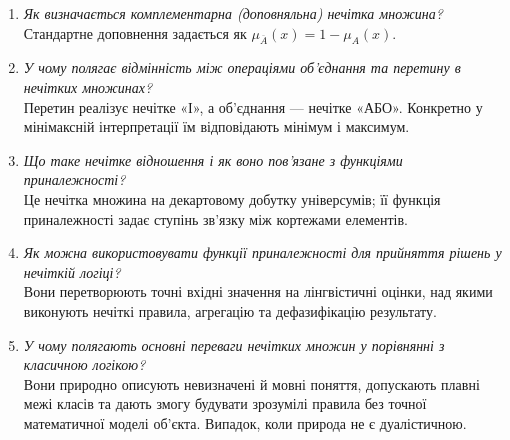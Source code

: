 \documentclass[12pt,a4paper]{article}
\begin{document}
\begin{enumerate}[leftmargin=*,itemsep=0.35em]
    Це чітка множина всіх \(x\), для яких \(\mu(x)\geq\alpha\).
  \item \textit{Як визначається комплементарна (доповняльна) нечітка множина?}\\
    Стандартне доповнення задається як
    \(\mu_{\overline A}(x)=1-\mu_A(x)\).
  \item \textit{У чому полягає відмінність між операціями об'єднання та перетину в
    нечітких множинах?}\\
    Перетин реалізує нечітке «І», а об'єднання --- нечітке «АБО». Конкретно у
    мінімаксній інтерпретації їм відповідають мінімум і максимум.
  \item \textit{Що таке нечітке відношення і як воно пов'язане з функціями
    приналежності?}\\
    Це нечітка множина на декартовому добутку універсумів; її функція
    приналежності задає ступінь зв'язку між кортежами елементів.
  \item \textit{Як можна використовувати функції приналежності для прийняття рішень у
    нечіткій логіці?}\\
    Вони перетворюють точні вхідні значення на лінгвістичні оцінки, над
    якими виконують нечіткі правила, агрегацію та дефазифікацію результату.
  \item \textit{У чому полягають основні переваги нечітких множин у порівнянні з
    класичною логікою?}\\
    Вони природно описують невизначені й мовні поняття, допускають плавні
    межі класів та дають змогу будувати зрозумілі правила без точної
    математичної моделі об'єкта. Випадок, коли природа не є дуалістичною.
\end{enumerate}
\end{document}

